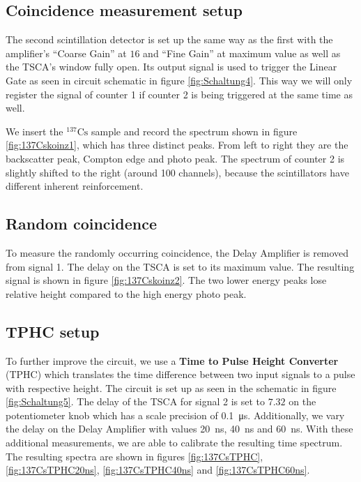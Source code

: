 \subsection{Coincidence measurement setup}
%
The second scintillation detector is set up the same way as the first with the amplifier's \enquote{Coarse Gain} at $16$ and \enquote{Fine Gain} at maximum value as well as the TSCA's window fully open.
Its output signal is used to trigger the Linear Gate as seen in circuit schematic in figure \ref{fig:Schaltung4}.
This way we will only register the signal of counter 1 if counter 2 is being triggered at the same time as well.
%
\par
%
We insert the $^{137}\text{Cs}$ sample and record the spectrum shown in figure \ref{fig:137Cskoinz1}, which has three distinct peaks.
From left to right they are the backscatter peak, Compton edge and photo peak.
The spectrum of counter 2 is slightly shifted to the right (around 100 channels), because the scintillators have different inherent reinforcement.
%
\subsection{Random coincidence}
%
To measure the randomly occurring coincidence, the Delay Amplifier is removed from signal 1.
The delay on the TSCA is set to its maximum value.
The resulting signal is shown in figure \ref{fig:137Cskoinz2}.
The two lower energy peaks lose relative height compared to the high energy photo peak.
%
\subsection{TPHC setup}
%
To further improve the circuit, we use a \textbf{Time to Pulse Height Converter} (TPHC) which translates the time difference between two input signals to a pulse with respective height.
The circuit is set up as seen in the schematic in figure \ref{fig:Schaltung5}.
The delay of the TSCA for signal 2 is set to $7.32$ on the potentiometer knob which has a scale precision of \SI{0.1}{\micro\second}.
Additionally, we vary the delay on the Delay Amplifier with values \SI{20}{\nano\second}, \SI{40}{\nano\second} and \SI{60}{\nano\second}.
With these additional measurements, we are able to calibrate the resulting time spectrum.
The resulting spectra are shown in figures \ref{fig:137CsTPHC}, \ref{fig:137CsTPHC20ns}, \ref{fig:137CsTPHC40ns} and \ref{fig:137CsTPHC60ns}.
%
